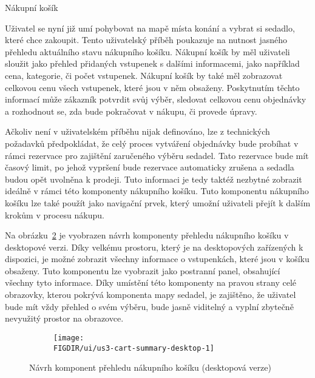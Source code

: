 \begin{subsection}{Nákupní košík}
    \label{subsec:narvh-ui-transformace-uzivatelskych-pribehu-nakupni-kosik}
    \userstoryshoppingcart

    Uživatel se nyní již umí pohybovat na mapě místa konání a vybrat si sedadlo, které chce zakoupit.
    Tento uživatelský příběh poukazuje na nutnost jasného přehledu aktuálního stavu nákupního košíku.
    Nákupní košík by měl uživateli sloužit jako přehled přidaných vstupenek s dalšími informacemi, jako například cena, kategorie, či počet vstupenek.
    Nákupní košík by také měl zobrazovat celkovou cenu všech vstupenek, které jsou v něm obsaženy.
    Poskytnutím těchto informací může zákazník potvrdit svůj výběr, sledovat celkovou cenu objednávky a rozhodnout se, zda bude pokračovat v nákupu, či provede úpravy.

    Ačkoliv není v uživatelském příběhu nijak definováno, lze z technických požadavků předpokládat, že celý proces vytváření objednávky bude probíhat v rámci rezervace pro zajištění zaručeného výběru sedadel.
    Tato rezervace bude mít časový limit, po jehož vypršení bude rezervace automaticky zrušena a sedadla budou opět uvolněna k prodeji.
    Tuto informaci je tedy taktéž nezbytné zobrazit ideálně v rámci této komponenty nákupního košíku.
    Tuto komponentu nákupního košíku lze také použít jako navigační prvek, který umožní uživateli přejít k dalším krokům v procesu nákupu.

    Na obrázku~\ref{fig:us3-cart-summary-desktop} je vyobrazen návrh komponenty přehledu nákupního košíku v desktopové verzi.
    Díky velkému prostoru, který je na desktopových zařízených k dispozici, je možné zobrazit všechny informace o vstupenkách, které jsou v košíku obsaženy.
    Tuto komponentu lze vyobrazit jako postranní panel, obsahující všechny tyto informace.
    Díky umístění této komponenty na pravou strany celé obrazovky, kterou pokrývá komponenta mapy sedadel, je zajištěno, že uživatel bude mít vždy přehled o svém výběru, bude jasně viditelný a vyplní zbytečně nevyužitý prostor na obrazovce.

    \begin{figure}[H]
        \centering
        \begin{subfigure}{\textwidth}
            \texttt{[image: \\FIGDIR/ui/us3-cart-summary-desktop-1]}
            \label{fig:uus3-cart-summary-desktop-1}
        \end{subfigure}
        \caption{Návrh komponent přehledu nákupního košíku (desktopová verze)}
        \label{fig:us3-cart-summary-desktop}
    \end{figure}


\end{subsection}
